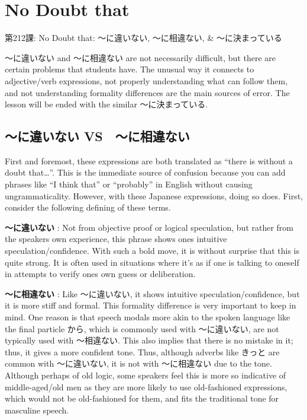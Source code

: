     
\chapter{No Doubt that}

\begin{center}
\begin{Large}
第212課: No Doubt that: ～に違いない, ～に相違ない, \& ～に決まっている 
\end{Large}
\end{center}
 
\par{ ～に違いない and ～に相違ない are not necessarily difficult, but there are certain problems that students have. The unusual way it connects to adjective\slash verb expressions, not properly understanding what can follow them, and not understanding formality differences are the main sources of error. The lesson will be ended with the similar ～に決まっている. }
      
\section{～に違いない VS　～に相違ない}
 
\par{ First and foremost, these expressions are both translated as “there is without a doubt that…”. This is the immediate source of confusion because you can add phrases like “I think that” or “probably” in English without causing ungrammaticality. However, with these Japanese expressions, doing so does. First, consider the following defining of these terms. }

\par{\textbf{～に違いない }: Not from objective proof or logical speculation, but rather from the speaker\textquotesingle s own experience, this phrase shows one\textquotesingle s intuitive speculation\slash confidence. With such a bold move, it is without surprise that this is quite strong. It is often used in situations where it's as if one is talking to oneself in attempts to verify one\textquotesingle s own guess or deliberation. }

\par{\textbf{～に相違ない }: Like ～に違いない, it shows intuitive speculation\slash confidence, but it is more stiff and formal. This formality difference is very important to keep in mind. One reason is that speech modals more akin to the spoken language like the final particle から, which is commonly used with ～に違いない, are not typically used with ～相違ない. This also implies that there is no mistake in it; thus, it gives a more confident tone. Thus, although adverbs like きっと are common with ～に違いない, it is not with ～に相違ない due to the tone. Although perhaps of old logic, some speakers feel this is more so indicative of middle-aged\slash old men as they are more likely to use old-fashioned expressions, which would not be old-fashioned for them, and fits the traditional tone for masculine speech. }

